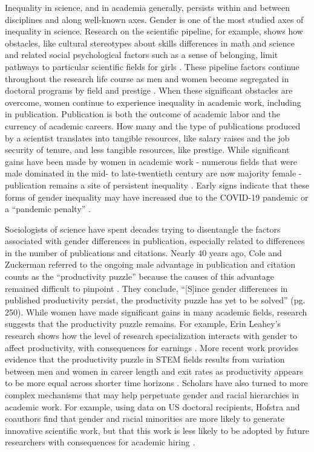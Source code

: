 \documentclass[
  10pt,
  letterpaper,
]{article}
\begin{document}
Inequality in science, and in academia generally, persists within and
between disciplines and along well-known axes. Gender is one of the most
studied axes of inequality in science. Research on the scientific
pipeline, for example, shows how obstacles, like cultural stereotypes
about skills differences in math and science and related social
psychological factors such as a sense of belonging, limit pathways to
particular scientific fields for girls
\citep{cech_professional_2011, ma_math_2021, penner_men_2019}. These
pipeline factors continue throughout the research life course as men and
women become segregated in doctoral programs by field and prestige
\citep{weeden_degrees_2017a}. When these significant obstacles are
overcome, women continue to experience inequality in academic work,
including in publication. Publication is both the outcome of academic
labor and the currency of academic careers. How many and the type of
publications produced by a scientist translates into tangible resources,
like salary raises and the job security of tenure, and less tangible
resources, like prestige. While significant gains have been made by
women in academic work - numerous fields that were male dominated in the
mid- to late-twentieth century are now majority female - publication
remains a site of persistent inequality \citep{xie_sex_1998}. Early
signs indicate that these forms of gender inequality may have increased
due to the COVID-19 pandemic or a ``pandemic penalty''
\citep{king_pandemic_2021}.

Sociologists of science have spent decades trying to disentangle the
factors associated with gender differences in publication, especially
related to differences in the number of publications and citations.
Nearly 40 years ago, Cole and Zuckerman referred to the ongoing male
advantage in publication and citation counts as the ``productivity
puzzle'' because the causes of this advantage remained difficult to
pinpoint \citep{cole_productivity_1984}. They conclude, ``{[}S{]}ince
gender differences in published productivity persist, the productivity
puzzle has yet to be solved'' (pg. 250). While women have made
significant gains in many academic fields, research suggests that the
productivity puzzle remains. For example, Erin Leahey's research shows
how the level of research specialization interacts with gender to affect
productivity, with consequences for earnings
\citep{leahey_gender_2006, leahey_not_2007}. More recent work provides
evidence that the productivity puzzle in STEM fields results from
variation between men and women in career length and exit rates as
productivity appears to be more equal across shorter time horizons
\citep{huang_historical_2020}. Scholars have also turned to more complex
mechanisms that may help perpetuate gender and racial hierarchies in
academic work. For example, using data on US doctoral recipients,
Hofstra and coauthors find that gender and racial minorities are more
likely to generate innovative scientific work, but that this work is
less likely to be adopted by future researchers with consequences for
academic hiring \citep{hofstra_diversity_2020}.
\end{document}
